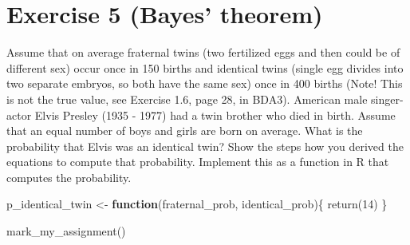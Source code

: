 \documentclass[
]{article}
\newenvironment{Shaded}{\begin{snugshade}}{\end{snugshade}}
\newcommand{\ControlFlowTok}[1]{\textcolor[rgb]{0.13,0.29,0.53}{\textbf{#1}}}
\newcommand{\DecValTok}[1]{\textcolor[rgb]{0.00,0.00,0.81}{#1}}
\newcommand{\FunctionTok}[1]{\textcolor[rgb]{0.00,0.00,0.00}{#1}}
\newcommand{\NormalTok}[1]{#1}
\newcommand{\OtherTok}[1]{\textcolor[rgb]{0.56,0.35,0.01}{#1}}
\begin{document}
\hypertarget{exercise-5-bayes-theorem}{%
\section{Exercise 5 (Bayes' theorem)}\label{exercise-5-bayes-theorem}}

Assume that on average fraternal twins (two fertilized eggs and then
could be of different sex) occur once in 150 births and identical twins
(single egg divides into two separate embryos, so both have the same
sex) once in 400 births (Note! This is not the true value, see Exercise
1.6, page 28, in BDA3). American male singer-actor Elvis Presley (1935 -
1977) had a twin brother who died in birth. Assume that an equal number
of boys and girls are born on average. What is the probability that
Elvis was an identical twin? Show the steps how you derived the
equations to compute that probability. Implement this as a function in R
that computes the probability.

\begin{Shaded}
\begin{Highlighting}[]
\NormalTok{p\_identical\_twin }\OtherTok{\textless{}{-}} \ControlFlowTok{function}\NormalTok{(fraternal\_prob, identical\_prob)\{}
  \FunctionTok{return}\NormalTok{(}\DecValTok{14}\NormalTok{)}
\NormalTok{\}}

\FunctionTok{mark\_my\_assignment}\NormalTok{()}
\end{Highlighting}
\end{Shaded}
\end{document}
